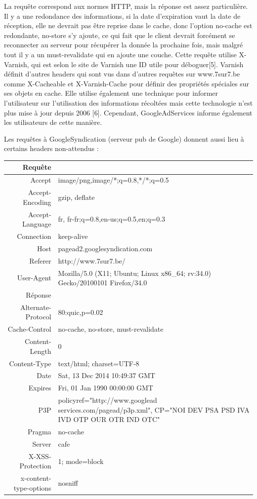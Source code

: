 \documentclass[conference]{IEEEtran}
\begin{document}
La requête correspond aux normes HTTP, mais la réponse est assez particulière. Il y a une redondance des informations, si la date d'expiration vaut la date de réception, elle ne devrait pas être reprise dans le cache, donc l'option no-cache est redondante, no-store s'y ajoute, ce qui fait que le client devrait forcément se reconnecter au serveur pour récupérer la donnée la prochaine fois, mais malgré tout il y a un must-revalidate qui en ajoute une couche. Cette requête utilise X-Varnish, qui est selon le site de Varnish une ID utile pour déboguer[5]. Varnish définit d'autres headers qui sont vus dans d'autres requêtes sur www.7sur7.be comme X-Cacheable et X-Varnish-Cache pour définir des propriétés spéciales sur ses objets en cache.  Elle utilise également une technique pour informer l'utilisateur sur l'utilisation des informations récoltées mais cette technologie n'est plus mise à jour depuis 2006 [6]. Cependant, GoogleAdServices informe également les utilisateurs de cette manière. 

Les requêtes à GoogleSyndication (serveur pub de Google) donnent aussi lieu à certains headers non-attendus :
\begin{tabular}{|r|p{5cm}|}
  \hline
  Requête & \\
  \hline
  Accept & image/png,image/*;q=0.8,*/*;q=0.5 \\
  Accept-Encoding & gzip, deflate \\
  Accept-Language & fr, fr-fr;q=0.8,en-us;q=0.5,en;q=0.3 \\
  Connection & keep-alive \\
  Host & pagead2.googlesyndication.com \\
  Referer & http://www.7sur7.be/ \\
  User-Agent & Mozilla/5.0 (X11; Ubuntu; Linux x86\_64; rv:34.0) Gecko/20100101 Firefox/34.0 \\
  \hline
  Réponse & \\
  \hline
  Alternate-Protocol & 80:quic,p=0.02 \\
  Cache-Control & no-cache, no-store, must-revalidate \\
  Content-Length & 0 \\
  Content-Type & text/html; charset=UTF-8 \\
  Date & Sat, 13 Dec 2014 10:49:37 GMT \\
  Expires & Fri, 01 Jan 1990 00:00:00 GMT \\
  P3P & policyref="http://www.googlead services.com/pagead/p3p.xml", CP="NOI DEV PSA PSD IVA IVD OTP OUR OTR IND OTC" \\
  Pragma & no-cache \\
  Server & cafe \\
  X-XSS-Protection & 1; mode=block \\
  x-content-type-options & nosniff \\
  \hline
\end{tabular}
\end{document}
